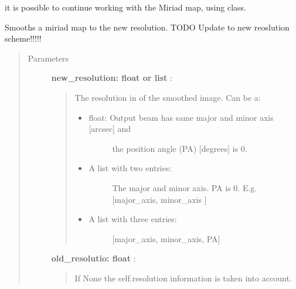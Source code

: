 \documentclass[a4paper,10pt,english]{sphinxmanual}
\begin{document}
\begin{fulllineitems}
\begin{fulllineitems}
it is possible to continue working with the Miriad map, using
 class.

\end{fulllineitems}


\begin{fulllineitems}
\label{maps:astrolyze.maps.miriad.MiriadMap.smooth}
Smooths a miriad map to the new resolution. TODO Update to
new reoslution scheme!!!!!
\begin{quote}\begin{description}
\item[{Parameters }] \leavevmode
\textbf{new\_resolution: float or list} :
\begin{quote}

The resolution in of the smoothed image.
Can be a:
\begin{itemize}
\item {} \begin{description}
\item[{float: Output beam has same major and minor axis {[}arcsec{]} and}] \leavevmode
the position angle (PA) {[}degrees{]} is 0.

\end{description}

\item {} \begin{description}
\item[{A list with two entries:}] \leavevmode
The major and minor axis. PA is 0.
E.g. {[}major\_axis, minor\_axis {]}

\end{description}

\item {} \begin{description}
\item[{A list with three entries:}] \leavevmode
{[}major\_axis, minor\_axis, PA{]}

\end{description}

\end{itemize}
\end{quote}

\textbf{old\_resolutio: float} :
\begin{quote}

If None the self.resolution information is taken into account.
\end{quote}


\end{description}
\end{quote}
\end{fulllineitems}
\end{fulllineitems}
\end{document}
